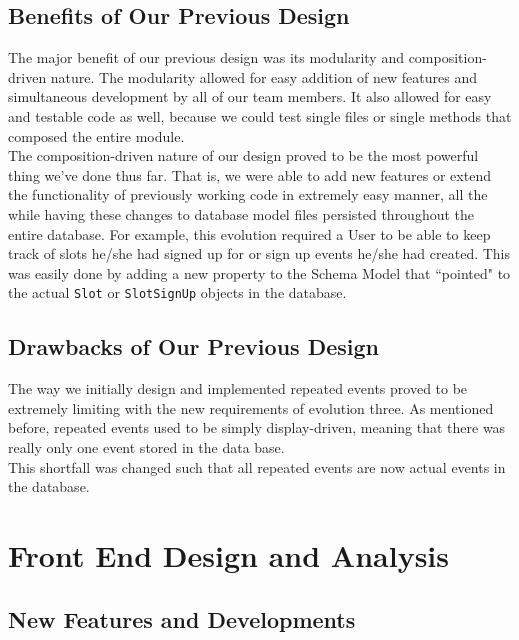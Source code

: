 \documentclass[11pt]{article}   %
\begin{document}
\subsection{Benefits of Our Previous Design}
The major benefit of our previous design was its modularity and composition-driven nature. The modularity allowed for easy addition of new features and simultaneous development by all of our team members. It also allowed for easy and testable code as well, because we could test single files or single methods that composed the entire module.\\

\noindent The composition-driven nature of our design proved to be the most powerful thing we've done thus far. That is, we were able to add new features or extend the functionality of previously working code in extremely easy manner, all the while having these changes to database model files persisted throughout the entire database. For example, this evolution required a User to be able to keep track of slots he/she had signed up for or sign up events he/she had created. This was easily done by adding a new property to the Schema Model that ``pointed" to the actual \texttt{Slot} or \texttt{SlotSignUp} objects in the database.

\subsection{Drawbacks of Our Previous Design}
The way we initially design and implemented repeated events proved to be extremely limiting with the new requirements of evolution three. As mentioned before, repeated events used to be simply display-driven, meaning that there was really only one event stored in the data base.\\

\noindent This shortfall was changed such that all repeated events are now actual events in the database.


\section{Front End Design and Analysis}

\subsection{New Features and Developments}
\end{document}
